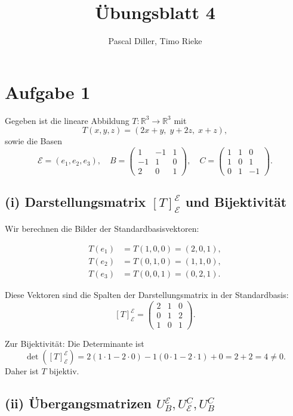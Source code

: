 \documentclass{article}
\title{Übungsblatt 4}
\author{Pascal Diller, Timo Rieke}
\begin{document}
\maketitle

\section*{Aufgabe 1}

Gegeben ist die lineare Abbildung \( T : \mathbb{R}^3 \to \mathbb{R}^3 \) mit
\[
T(x,y,z) = (2x + y,\; y + 2z,\; x + z),
\]
sowie die Basen
\[
\mathcal{E} = (e_1, e_2, e_3),\quad B = \begin{pmatrix}1 & -1 & 1 \\ -1 & 1 & 0 \\ 2 & 0 & 1\end{pmatrix},\quad C = \begin{pmatrix}1 & 1 & 0 \\ 1 & 0 & 1 \\ 0 & 1 & -1\end{pmatrix}.
\]

\subsection*{(i) Darstellungsmatrix \([T]_{\mathcal{E}}^{\mathcal{E}}\) und Bijektivität}

Wir berechnen die Bilder der Standardbasisvektoren:

\[
\begin{aligned}
T(e_1) &= T(1,0,0) = (2, 0, 1), \\
T(e_2) &= T(0,1,0) = (1, 1, 0), \\
T(e_3) &= T(0,0,1) = (0, 2, 1).
\end{aligned}
\]

Diese Vektoren sind die Spalten der Darstellungsmatrix in der Standardbasis:
\[
[T]_{\mathcal{E}}^{\mathcal{E}} = 
\begin{pmatrix}
2 & 1 & 0 \\
0 & 1 & 2 \\
1 & 0 & 1
\end{pmatrix}.
\]

Zur Bijektivität: Die Determinante ist
\[
\det([T]_{\mathcal{E}}^{\mathcal{E}}) = 2(1\cdot1 - 2\cdot0) - 1(0\cdot1 - 2\cdot1) + 0 = 2 + 2 = 4 \neq 0.
\]
Daher ist \( T \) bijektiv.

\subsection*{(ii) Übergangsmatrizen \( U_B^{\mathcal{E}}, U_{\mathcal{E}}^C, U_B^C \)}
\end{document}
